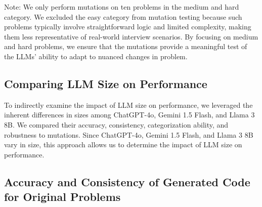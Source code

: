 \documentclass[times, 10pt,twocolumn]{article}
\begin{document}
Note: We only perform mutations on ten problems in the medium and hard category. We excluded the easy category from mutation testing because such problems typically involve straightforward logic and limited complexity, making them less representative of real-world interview scenarios. By focusing on medium and hard problems, we ensure that the mutations provide a meaningful test of the LLMs’ ability to adapt to nuanced changes in problem.

\subsection{Comparing LLM Size on Performance}
To indirectly examine the impact of LLM size on performance, we leveraged the inherent differences in sizes among ChatGPT-4o, Gemini 1.5 Flash, and Llama 3 8B. We compared their accuracy, consistency, categorization ability, and robustness to mutations. Since ChatGPT-4o, Gemini 1.5 Flash, and Llama 3 8B vary in size, this approach allows us to determine the impact of LLM size on performance.


\subsection{Accuracy and Consistency of Generated Code for Original Problems}
\end{document}
